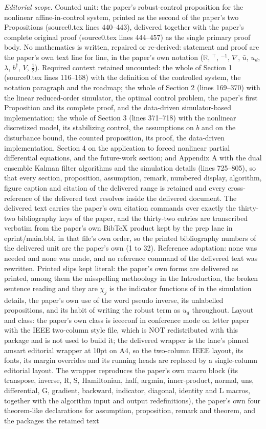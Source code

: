 \documentclass[10pt,a4paper]{amsart}
\newcommand{\tp}{^\top}
\newcommand{\inv}{^{-1}}
\newcommand{\R}{\mathbb{R}}
\newcommand{\half}{\frac{1}{2}}
\newcommand{\grad}{\nabla}
\begin{document}
\noindent\textit{Editorial scope.} Counted unit: the paper's robust-control proposition for the nonlinear affine-in-control system, printed as the second of the paper's two Propositions (source0.tex lines 440--443), delivered together with the paper's complete original proof (source0.tex lines 444--457) as the single primary proof body. No mathematics is written, repaired or re-derived: statement and proof are the paper's own text line for line, in the paper's own notation ($\R$, $\tp$, $\inv$, $\grad$, $\bar{u}$, $u_d$, $\lambda$, $b^{\dagger}$, $V$, $\half$). Required context retained uncounted: the whole of Section 1 (source0.tex lines 116--168) with the definition of the controlled system, the notation paragraph and the roadmap; the whole of Section 2 (lines 169--370) with the linear reduced-order simulator, the optimal control problem, the paper's first Proposition and its complete proof, and the data-driven simulator-based implementation; the whole of Section 3 (lines 371--718) with the nonlinear discretized model, its stabilizing control, the assumptions on $b$ and on the disturbance bound, the counted proposition, its proof, the data-driven implementation, Section 4 on the application to forced nonlinear partial differential equations, and the future-work section; and Appendix A with the dual ensemble Kalman filter algorithms and the simulation details (lines 725--805), so that every section, proposition, assumption, remark, numbered display, algorithm, figure caption and citation of the delivered range is retained and every cross-reference of the delivered text resolves inside the delivered document. The delivered text carries the paper's own citation commands over exactly the thirty-two bibliography keys of the paper, and the thirty-two entries are transcribed verbatim from the paper's own BibTeX product kept by the prep lane in eprint/main.bbl, in that file's own order, so the printed bibliography numbers of the delivered unit are the paper's own (1 to 32). Reference adaptation: none was needed and none was made, and no reference command of the delivered text was rewritten. Printed slips kept literal: the paper's own forms are delivered as printed, among them the misspelling methoology in the Introduction, the broken sentence reading and they are $\chi_j$ is the indicator functions of in the simulation details, the paper's own use of the word pseudo inverse, its unlabelled propositions, and its habit of writing the robust term as $u_d$ throughout. Layout and class: the paper's own class is ieeeconf in conference mode on letter paper with the IEEE two-column style file, which is NOT redistributed with this package and is not used to build it; the delivered wrapper is the lane's pinned amsart editorial wrapper at 10pt on A4, so the two-column IEEE layout, its fonts, its margin overrides and its running heads are replaced by a single-column editorial layout. The wrapper reproduces the paper's own macro block (its transpose, inverse, R, S, Hamiltonian, half, argmin, inner-product, normal, uns, differential, G, gradient, backward, indicator, diagonal, identity and L macros, together with the algorithm input and output redefinitions), the paper's own four theorem-like declarations for assumption, proposition, remark and theorem, and the packages the retained text 
\end{document}
